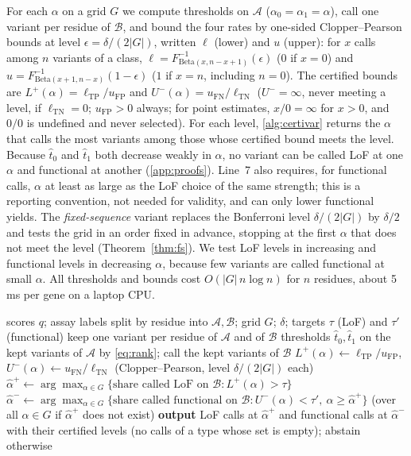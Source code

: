 For each $\alpha$ on a grid $G$ we compute thresholds on $\mathcal A$ ($\alpha_0=\alpha_1=\alpha$), call one variant per
residue of $\mathcal B$, and bound the four rates by one-sided Clopper--Pearson bounds \cite{ClopperPearson1934} at level
$\epsilon=\delta/(2|G|)$, written $\ell$ (lower) and $u$ (upper): for $x$ calls among $n$ variants of a class, $\ell=F^{-1}_{\mathrm{Beta}(x,n-x+1)}(\epsilon)$
($0$ if $x=0$) and $u=F^{-1}_{\mathrm{Beta}(x+1,n-x)}(1-\epsilon)$ ($1$ if $x=n$, including $n=0$). The certified
bounds are $L^+(\alpha)=\ell_{\mathrm{TP}}/u_{\mathrm{FP}}$ and
$U^-(\alpha)=u_{\mathrm{FN}}/\ell_{\mathrm{TN}}$ ($U^-=\infty$, never meeting a level, if $\ell_{\mathrm{TN}}=0$;
$u_{\mathrm{FP}}>0$ always; for point estimates, $x/0=\infty$ for $x>0$, and $0/0$ is undefined and never selected). For each level, \cref{alg:certivar} returns the $\alpha$ that calls the most variants
among those whose certified bound meets the level. Because $\hat t_0$ and $\hat t_1$ both decrease weakly in $\alpha$,
no variant can be called LoF at one $\alpha$ and functional at another (\cref{app:proofs}). Line~7 also requires, for functional
calls, $\alpha$ at least as large as the LoF choice of the same strength; this is a reporting convention, not needed for validity, and can
only lower functional yields. The \emph{fixed-sequence} variant replaces the
Bonferroni level $\delta/(2|G|)$ by $\delta/2$ and tests the grid in an order fixed in advance, stopping at the first
$\alpha$ that does not meet the level (Theorem~\ref{thm:fs}). We test LoF levels in increasing and functional levels in
decreasing $\alpha$, because few variants are called functional at small $\alpha$. All thresholds and bounds cost
$O(|G|\,n\log n)$ for $n$ residues, about 5\,ms per gene on a laptop CPU.

\begin{algorithm}[t]
\caption{\textsc{CertiVar} for one gene and one evidence level}\label{alg:certivar}
\begin{algorithmic}[1]
\Require scores $q$; assay labels split by residue into $\mathcal A,\mathcal B$; grid $G$; $\delta$; targets $\tau$
(LoF) and $\tau'$ (functional)
\State keep one variant per residue of $\mathcal A$ and of $\mathcal B$
\State thresholds $\hat t_0,\hat t_1$ on the kept variants of $\mathcal A$ by \eqref{eq:rank}; call the kept variants of
$\mathcal B$
\State $L^+(\alpha)\gets \ell_{\mathrm{TP}}/u_{\mathrm{FP}}$, $U^-(\alpha)\gets u_{\mathrm{FN}}/\ell_{\mathrm{TN}}$
(Clopper--Pearson, level $\delta/(2|G|)$ each)
\EndFor
\State $\hat\alpha^+\gets\arg\max_{\alpha\in G}\{\text{share called LoF on }\mathcal B : L^+(\alpha)>\tau\}$
\State $\hat\alpha^-\gets\arg\max_{\alpha\in G}\{\text{share called functional on }\mathcal B : U^-(\alpha)<\tau',\ \alpha\ge\hat\alpha^+\}$
(over all $\alpha\in G$ if $\hat\alpha^+$ does not exist)
\State \textbf{output} LoF calls at $\hat\alpha^+$ and functional calls at $\hat\alpha^-$ with their certified levels (no
calls of a type whose set is empty); abstain otherwise
\end{algorithmic}
\end{algorithm}


